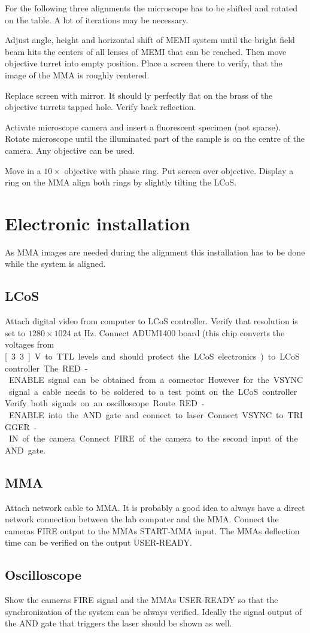\documentclass{scrartcl}
\begin{document}

For the following three alignments the microscope has to be shifted and
rotated on the table. A lot of iterations may be necessary.

 Adjust angle, height and horizontal shift of
MEMI system until the bright field beam hits the centers of all lenses
of MEMI that can be reached.  Then move objective turret into empty
position. Place a screen there to verify, that the image of the MMA is
roughly centered.

Replace screen with mirror. It should ly perfectly flat on the brass of the
objective turrets tapped hole. Verify back reflection.

 Activate microscope camera
and insert a fluorescent specimen (not sparse).  Rotate microscope
until the illuminated part of the sample is on the centre of the
camera. Any objective can be used.

 Move in a $10\times$
objective with phase ring. Put screen over objective. Display a ring
on the MMA align both rings by slightly tilting the LCoS.

\section{Electronic installation}
As MMA images are needed during the alignment this installation has to
be done while the system is aligned.

\subsection{LCoS}
Attach digital video from computer to LCoS controller. Verify that
resolution is set to $1280\times 1024$ at \unit[60]{Hz}. Connect
ADUM1400 board (this chip converts the voltages from \unit[3.3]{V} to
TTL levels and should protect the LCoS electronics) to LCoS
controller.  The RED-ENABLE signal can be obtained from a
connector. However for the VSYNC signal a cable needs to be soldered
to a test point on the LCoS controller.

Verify both signals on an oscilloscope. Route RED-ENABLE into the AND
gate and connect to laser. Connect VSYNC to TRIGGER-IN of the
camera. Connect FIRE of the camera to the second input of the AND
gate.

\subsection{MMA}
Attach network cable to MMA. It is probably a good idea to always have
a direct network connection between the lab computer and the MMA.
Connect the cameras FIRE output to the MMAs START-MMA input. The MMAs
deflection time can be verified on the output USER-READY.

\subsection{Oscilloscope}
Show the cameras FIRE signal and the MMAs USER-READY so that the
synchronization of the system can be always verified. Ideally the
signal output of the AND gate that triggers the laser should be shown
as well.
\end{document}
